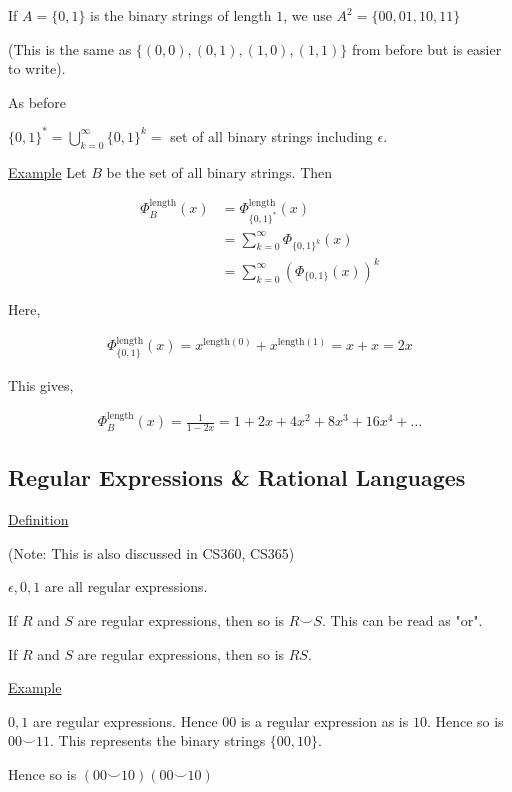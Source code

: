 \documentclass{article}
\begin{document}
If $A = \{0,1\}$ is the binary strings of length $1$, we use $A^2 = \{00,01,10,11\}$

(This is the same as $\{(0,0),(0,1),(1,0),(1,1)\}$ from before but is easier to write). 

As before

$\{0,1\}^* = \bigcup_{k=0}^{\infty}\{0,1\}^k = $ set of all binary strings including $\epsilon$.


\underline{Example} Let $B$ be the set of all binary strings. Then

\begin{align*}
    \Phi_{B}^{\text{length}}(x) &= \Phi_{\{0,1\}^*}^{\text{length}}(x) \\
    &= \sum_{k=0}^{\infty}\Phi_{\{0,1\}^k}(x) \\
    &= \sum_{k=0}^{\infty}(\Phi_{\{0,1\}}(x))^k
\end{align*}

Here, 

\begin{align*}
    \Phi_{\{0,1\}}^{\text{length}}(x) = x^{\text{length}(0)} + x^{\text{length}(1)} = x + x = 2x
\end{align*}

This gives,

\begin{align*}
    \Phi_{B}^{\text{length}}(x) = \frac{1}{1-2x} = 1 + 2x + 4x^2 + 8x^3 + 16x^4 + \ldots
\end{align*}

\subsection{Regular Expressions \& Rational Languages}

\underline{Definition}

(Note: This is also discussed in CS360, CS365)

$\epsilon,0,1$ are all regular expressions.

If $R$ and $S$ are regular expressions, then so is $R \smile S$. This can be read as "or".

If $R$ and $S$ are regular expressions, then so is $RS$.

\underline{Example}

$0,1$ are regular expressions. Hence $00$ is a regular expression as is $10$. Hence so is $00 \smile 11$. This represents the binary strings $\{00,10\}$.

Hence so is $(00 \smile 10)(00 \smile 10)$
\end{document}
